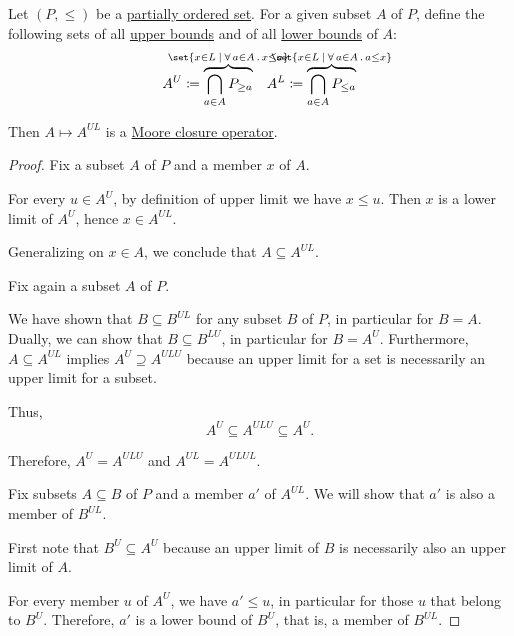 \begin{lemma}\label{thm:dedekind_macnielle_closure}
  Let \( (P, \leq) \) be a \hyperref[def:partially_ordered_set]{partially ordered set}. For a given subset \( A \) of \( P \), define the following sets of all \hyperref[def:extremal_points/upper_and_lower_bounds]{upper bounds} and of all \hyperref[def:extremal_points/upper_and_lower_bounds]{lower bounds} of \( A \):
  \begin{align*}
    A^U \coloneqq \overbrace{\bigcap_{a \in A} P_{\geq a}}^{\mathclap{\set{ x \in L \given \qforall {a \in A} x \leq a }}}
    &&
    A^L \coloneqq \overbrace{\bigcap_{a \in A} P_{\leq a}}^{\mathclap{\set{ x \in L \given \qforall {a \in A} a \leq x }}}
  \end{align*}

  Then \( A \mapsto A^{UL} \) is a \hyperref[def:moore_closure_operator]{Moore closure operator}.
\end{lemma}
\begin{proof}
   Fix a subset \( A \) of \( P \) and a member \( x \) of \( A \).

  For every \( u \in A^U \), by definition of upper limit we have \( x \leq u \). Then \( x \) is a lower limit of \( A^U \), hence \( x \in A^{UL} \).

  Generalizing on \( x \in A \), we conclude that \( A \subseteq A^{UL} \).

   Fix again a subset \( A \) of \( P \).

  We have shown that \( B \subseteq B^{UL} \) for any subset \( B \) of \( P \), in particular for \( B = A \). Dually, we can show that \( B \subseteq B^{LU} \), in particular for \( B = A^U \). Furthermore, \( A \subseteq A^{UL} \) implies \( A^U \supseteq A^{ULU} \) because an upper limit for a set is necessarily an upper limit for a subset.

  Thus,
  \begin{equation*}
    A^U \subseteq A^{ULU} \subseteq A^U.
  \end{equation*}

  Therefore, \( A^U = A^{ULU} \) and \( A^{UL} = A^{ULUL} \).

   Fix subsets \( A \subseteq B \) of \( P \) and a member \( a' \) of \( A^{UL} \). We will show that \( a' \) is also a member of \( B^{UL} \).

  First note that \( B^U \subseteq A^U \) because an upper limit of \( B \) is necessarily also an upper limit of \( A \).

  For every member \( u \) of \( A^U \), we have \( a' \leq u \), in particular for those \( u \) that belong to \( B^U \). Therefore, \( a' \) is a lower bound of \( B^U \), that is, a member of \( B^{UL} \).
\end{proof}


